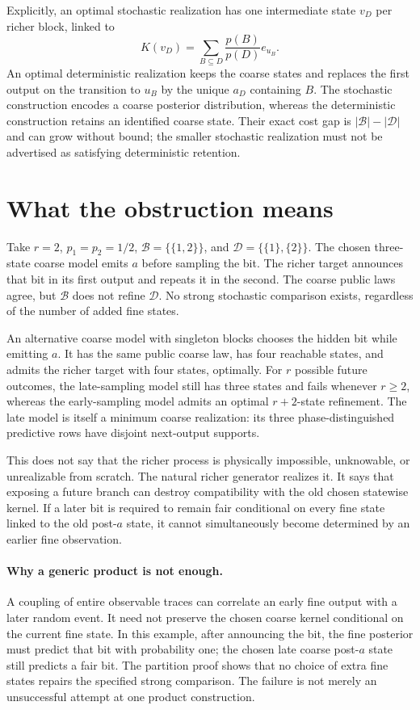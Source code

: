 \documentclass[11pt]{article}
\newcommand{\Bcal}{\mathcal{B}}
\newcommand{\Dcal}{\mathcal{D}}
\begin{document}
Explicitly, an optimal stochastic realization has one intermediate state $v_D$ per richer block, linked to
\[
 K(v_D)=\sum_{B\subseteq D}\frac{p(B)}{p(D)}e_{u_B}.
\]
An optimal deterministic realization keeps the coarse states and replaces the first output on the transition to $u_B$ by the unique $a_D$ containing $B$. The stochastic construction encodes a coarse posterior distribution, whereas the deterministic construction retains an identified coarse state. Their exact cost gap is $|\Bcal|-|\Dcal|$ and can grow without bound; the smaller stochastic realization must not be advertised as satisfying deterministic retention.

\section{What the obstruction means}
\label{sec:meaning}

Take $r=2$, $p_1=p_2=1/2$, $\Bcal=\{\{1,2\}\}$, and $\Dcal=\{\{1\},\{2\}\}$. The chosen three-state coarse model emits $a$ before sampling the bit. The richer target announces that bit in its first output and repeats it in the second. The coarse public laws agree, but $\Bcal$ does not refine $\Dcal$. No strong stochastic comparison exists, regardless of the number of added fine states.

An alternative coarse model with singleton blocks chooses the hidden bit while emitting $a$. It has the same public coarse law, has four reachable states, and admits the richer target with four states, optimally. For $r$ possible future outcomes, the late-sampling model still has three states and fails whenever $r\geq2$, whereas the early-sampling model admits an optimal $r+2$-state refinement. The late model is itself a minimum coarse realization: its three phase-distinguished predictive rows have disjoint next-output supports.

This does not say that the richer process is physically impossible, unknowable, or unrealizable from scratch. The natural richer generator realizes it. It says that exposing a future branch can destroy compatibility with the old chosen statewise kernel. If a later bit is required to remain fair conditional on every fine state linked to the old post-$a$ state, it cannot simultaneously become determined by an earlier fine observation.

\paragraph{Why a generic product is not enough.}
A coupling of entire observable traces can correlate an early fine output with a later random event. It need not preserve the chosen coarse kernel conditional on the current fine state. In this example, after announcing the bit, the fine posterior must predict that bit with probability one; the chosen late coarse post-$a$ state still predicts a fair bit. The partition proof shows that no choice of extra fine states repairs the specified strong comparison. The failure is not merely an unsuccessful attempt at one product construction.
\end{document}
